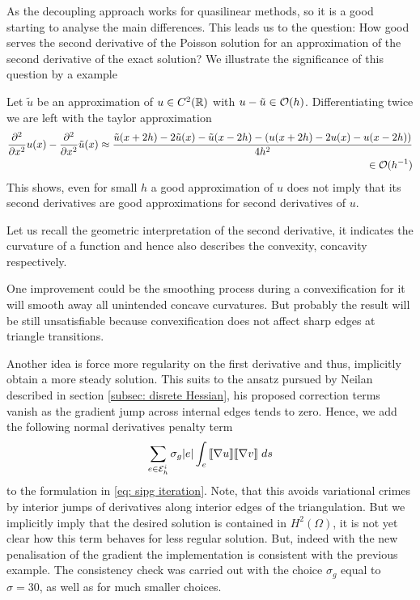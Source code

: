 As the decoupling approach works for quasilinear methods, so it is a good starting to analyse the main differences. This leads us to the question: How good serves the second derivative of the Poisson solution for an approximation of the second derivative of the exact solution?
We illustrate the significance of this question by a example
\begin{example}
	Let $\tilde u$ be an approximation of $u\in C^2(\mathbb{R})$ with $u-\tilde u \in \mathcal{O}(h)$. 
	Differentiating twice we are left with the taylor approximation
	\begin{align*}
		\frac {\partial^2} {\partial {x}^2} u(x)-\frac {\partial^2} {\partial {x}^2} \tilde u(x) \approx \frac{\tilde u(x+2h) - 2\tilde u(x) - \tilde u(x-2h) - (u(x+2h) - 2u(x) - u(x-2h))} {4h^2} \\
		 \in \mathcal{O}(h^{-1})
	\end{align*}
	This shows, even for small $h$ a good approximation of $u$ does not imply that its second derivatives are good approximations for second derivatives of $u$.
\end{example}

Let us recall the geometric interpretation of the second derivative, it indicates the curvature of a function and hence also describes the convexity, concavity respectively.

One improvement could be the smoothing process during a convexification for it will smooth away all unintended concave curvatures. But probably the result will be still unsatisfiable because convexification does not affect sharp edges at triangle transitions.

Another idea is force more regularity on the first derivative and thus, implicitly obtain a more steady solution. This suits to the ansatz pursued by Neilan described in section \ref{subsec: disrete Hessian}, his proposed correction terms vanish as the gradient jump across internal edges tends to zero.
Hence, we add the following normal derivatives penalty term 
\begin{align}
	\sum_{e \in \mathcal{E}_h^i} \sigma_g |e |\int_{e} {{\llbracket  \nabla u \rrbracket \llbracket \nabla v \rrbracket}\;ds} \label{eq: grad penalty term}
\end{align}
to the formulation in \eqref{eq: sipg iteration}.
Note, that this avoids variational crimes by interior jumps of derivatives along interior edges of the triangulation. But we implicitly imply that the desired solution is contained in $H^2(\Omega)$, it is not yet clear how this term behaves for less regular solution.
But, indeed with the new penalisation of the gradient the implementation is consistent with the previous example. The consistency check was carried out with the choice $\sigma_g$ equal to $\sigma=30$, as well as for much smaller choices.

